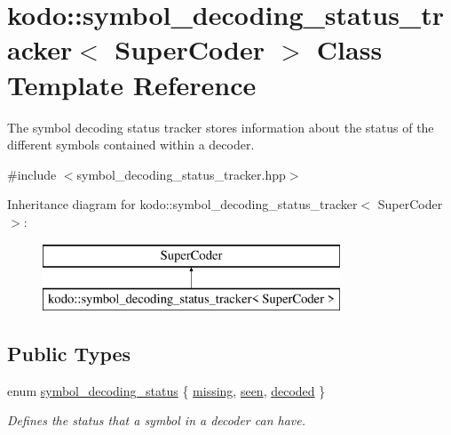 \hypertarget{classkodo_1_1symbol__decoding__status__tracker}{\section{kodo\-:\-:symbol\-\_\-decoding\-\_\-status\-\_\-tracker$<$ Super\-Coder $>$ Class Template Reference}
\label{classkodo_1_1symbol__decoding__status__tracker}
}


The symbol decoding status tracker stores information about the status of the different symbols contained within a decoder.  




{\ttfamily \#include $<$symbol\-\_\-decoding\-\_\-status\-\_\-tracker.\-hpp$>$}

Inheritance diagram for kodo\-:\-:symbol\-\_\-decoding\-\_\-status\-\_\-tracker$<$ Super\-Coder $>$\-:\begin{figure}[H]
\begin{center}
\leavevmode
\includegraphics[height=2.000000cm]{classkodo_1_1symbol__decoding__status__tracker}
\end{center}
\end{figure}
\subsection*{Public Types}
\begin{DoxyCompactItemize}
\item 
enum \hyperlink{classkodo_1_1symbol__decoding__status__tracker_a10357bdecff284a06070541d41a58b12}{symbol\-\_\-decoding\-\_\-status} \{ \hyperlink{classkodo_1_1symbol__decoding__status__tracker_a10357bdecff284a06070541d41a58b12aea21841da70e6405af19fabc4ff8bdd9}{missing}, 
\hyperlink{classkodo_1_1symbol__decoding__status__tracker_a10357bdecff284a06070541d41a58b12ad5b4a9a5a6b50466e8837c3cd98c3442}{seen}, 
\hyperlink{classkodo_1_1symbol__decoding__status__tracker_a10357bdecff284a06070541d41a58b12aad05458423e19c1ff1f3c0237f8cfbed}{decoded}
 \}
\begin{DoxyCompactList}\small\item\em Defines the status that a symbol in a decoder can have. \end{DoxyCompactList}\end{DoxyCompactItemize}
